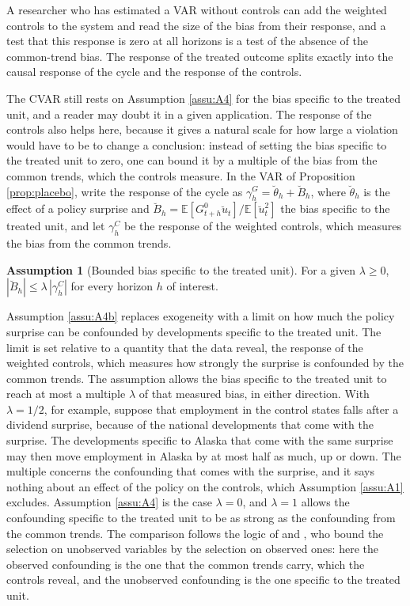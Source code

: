 \documentclass[12pt,a4paper]{article}
\theoremstyle{definition}
\newtheorem{assumptionc}{Assumption}\renewcommand{\theassumptionc}{4$'$}
\theoremstyle{definition}\newtheorem{example}{Example}
\theoremstyle{definition}\newtheorem{definition}{Definition}
\newcommand{\E}{\mathbb{E}}
\begin{document}
A researcher who has estimated a VAR without controls can add the weighted controls to the system and read the size of the bias from their response, and a test that this response is zero at all horizons is a test of the absence of the common-trend bias. The response of the treated outcome splits exactly into the causal response of the cycle and the response of the controls.

The CVAR still rests on Assumption \ref{assu:A4} for the bias specific to the treated unit, and a reader may doubt it in a given application. The response of the controls also helps here, because it gives a natural scale for how large a violation would have to be to change a conclusion: instead of setting the bias specific to the treated unit to zero, one can bound it by a multiple of the bias from the common trends, which the controls measure. In the VAR of Proposition \ref{prop:placebo}, write the response of the cycle as $\gamma^G_h=\breve\theta_h+\breve B_h$, where $\breve\theta_h$ is the effect of a policy surprise and $\breve B_h=\E[G^0_{t+h}\breve u_t]/\E[\breve u_t^2]$ the bias specific to the treated unit, and let $\gamma^C_h$ be the response of the weighted controls, which measures the bias from the common trends.

\begin{assumptionc}[Bounded bias specific to the treated unit\label{assu:A4b}]
For a given $\lambda\geq0$, $|\breve B_h|\leq\lambda\,|\gamma^C_h|$ for every horizon $h$ of interest.
\end{assumptionc}

Assumption \ref{assu:A4b} replaces exogeneity with a limit on how much the policy surprise can be confounded by developments specific to the treated unit. The limit is set relative to a quantity that the data reveal, the response of the weighted controls, which measures how strongly the surprise is confounded by the common trends. The assumption allows the bias specific to the treated unit to reach at most a multiple $\lambda$ of that measured bias, in either direction. With $\lambda=1/2$, for example, suppose that employment in the control states falls after a dividend surprise, because of the national developments that come with the surprise. The developments specific to Alaska that come with the same surprise may then move employment in Alaska by at most half as much, up or down. The multiple concerns the confounding that comes with the surprise, and it says nothing about an effect of the policy on the controls, which Assumption \ref{assu:A1} excludes. Assumption \ref{assu:A4} is the case $\lambda=0$, and $\lambda=1$ allows the confounding specific to the treated unit to be as strong as the confounding from the common trends. The comparison follows the logic of \citet{AltonjiElderTaber2005} and \citet{Oster2019}, who bound the selection on unobserved variables by the selection on observed ones: here the observed confounding is the one that the common trends carry, which the controls reveal, and the unobserved confounding is the one specific to the treated unit.
\end{document}

